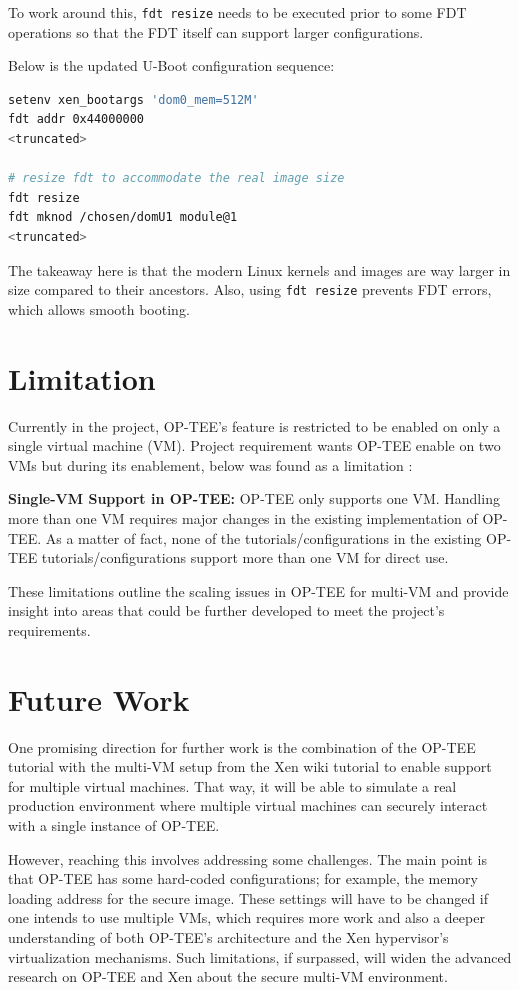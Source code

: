 \documentclass[acmtog]{acmart}
\begin{document}
To work around this, \texttt{fdt resize} needs to be executed prior to some FDT operations so that the FDT itself can support larger configurations.


Below is the updated U-Boot configuration sequence:

\begin{lstlisting}[language=bash, caption=Solution to U-Boot error]
setenv xen_bootargs 'dom0_mem=512M'
fdt addr 0x44000000
<truncated>

# resize fdt to accommodate the real image size
fdt resize
fdt mknod /chosen/domU1 module@1
<truncated>
\end{lstlisting}



The takeaway here is that the modern Linux kernels and images are way larger in size compared to their ancestors. Also, using \texttt{fdt resize} prevents FDT errors, which allows smooth booting.


\section{Limitation}
Currently in the project, OP-TEE's feature is restricted to be enabled on only a single virtual machine (VM). Project requirement wants OP-TEE enable on two VMs but during its enablement, below was found as a limitation :

\textbf{Single-VM Support in OP-TEE:} OP-TEE only supports one VM. Handling more than one VM requires major changes in the existing implementation of OP-TEE. As a matter of fact, none of the tutorials/configurations in the existing OP-TEE tutorials/configurations support more than one VM for direct use.

These limitations outline the scaling issues in OP-TEE for multi-VM and provide insight into areas that could be further developed to meet the project's requirements.


\section{Future Work}

One promising direction for further work is the combination of the OP-TEE tutorial with the multi-VM setup from the Xen wiki tutorial to enable support for multiple virtual machines. That way, it will be able to simulate a real production environment where multiple virtual machines can securely interact with a single instance of OP-TEE.

However, reaching this involves addressing some challenges. The main point is that OP-TEE has some hard-coded configurations; for example, the memory loading address for the secure image. These settings will have to be changed if one intends to use multiple VMs, which requires more work and also a deeper understanding of both OP-TEE's architecture and the Xen hypervisor's virtualization mechanisms. Such limitations, if surpassed, will widen the advanced research on OP-TEE and Xen about the secure multi-VM environment.
\end{document}
